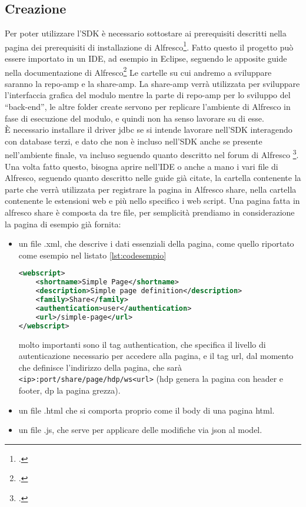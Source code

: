 \subsection{Creazione}
Per poter utilizzare l'SDK è necessario sottostare ai prerequisiti descritti nella pagina dei prerequisiti di installazione di Alfresco\footcite{site:alfresco-prerequisites}.
Fatto questo il progetto può essere importato in un IDE, ad esempio in Eclipse, seguendo le apposite guide nella documentazione di Alfresco\footcite{site:alfresco-rad}
Le cartelle su cui andremo a sviluppare saranno la repo-amp e la share-amp. La share-amp verrà utilizzata per sviluppare l’interfaccia grafica del modulo mentre la parte di repo-amp  per lo sviluppo del “back-end”, le altre folder create servono per replicare l’ambiente di Alfresco in fase di esecuzione del modulo, e quindi non ha senso lavorare su di esse.\\
È necessario installare il driver jdbc se si intende  lavorare nell’SDK interagendo con database terzi, e dato che non è incluso nell'SDK anche se presente nell'ambiente finale, va incluso seguendo quanto descritto nel forum di Alfresco \footcite{site:alfresco-jdbc}. 
Una volta fatto questo, bisogna aprire nell’IDE o anche a mano i vari file di Alfresco, seguendo quanto descritto nelle guide già citate, la cartella contenente la parte che verrà utilizzata per registrare la pagina in Alfresco share, nella cartella contenente le estensioni web e più nello specifico i web script. %
Una pagina fatta in alfresco share è composta da tre file, per semplicità prendiamo in considerazione la pagina di esempio già fornita:
\begin{itemize}
\item un file .xml, che descrive i dati essenziali della pagina, come quello riportato come esempio nel listato \ref{lst:codesempio}
\begin{lstlisting}[language=XML, caption=codice di una pagina di esempio, label=lst:codesempio]
<webscript>
    <shortname>Simple Page</shortname>
    <description>Simple page definition</description>
    <family>Share</family>
    <authentication>user</authentication>
    <url>/simple-page</url>
</webscript>
\end{lstlisting}
molto importanti sono il tag authentication, che specifica il livello di autenticazione necessario per accedere alla pagina, e il tag url, dal momento che definisce l’indirizzo della pagina, che sarà \texttt{<ip>:port/share/page/hdp/ws<url>} (hdp genera la pagina con header e footer, dp la pagina grezza).
\item un file .html che si comporta proprio come il body di una pagina html.
\item un file .js, che serve per applicare delle modifiche via json al model.
\end{itemize}
